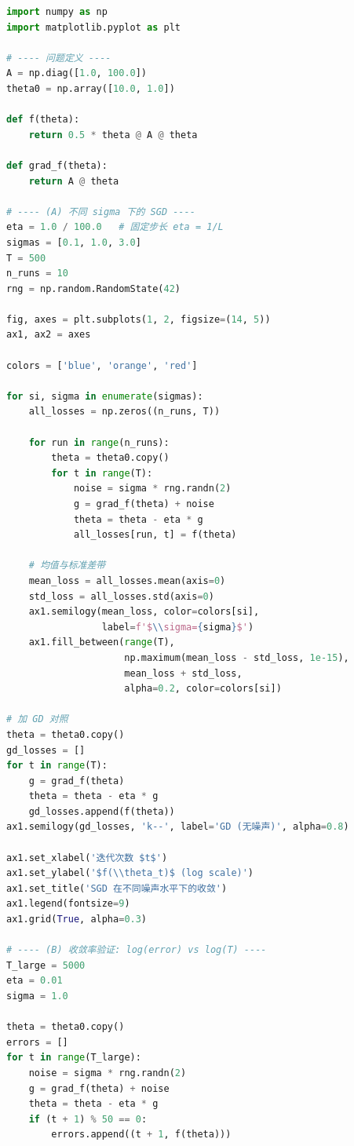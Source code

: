 \documentclass[12pt,a4paper]{ctexart}
\theoremstyle{definition}
\theoremstyle{plain}
\begin{document}
\begin{lstlisting}[language=Python, caption={SGD 噪声方差与收敛率验证}]
import numpy as np
import matplotlib.pyplot as plt

# ---- 问题定义 ----
A = np.diag([1.0, 100.0])
theta0 = np.array([10.0, 1.0])

def f(theta):
    return 0.5 * theta @ A @ theta

def grad_f(theta):
    return A @ theta

# ---- (A) 不同 sigma 下的 SGD ----
eta = 1.0 / 100.0   # 固定步长 eta = 1/L
sigmas = [0.1, 1.0, 3.0]
T = 500
n_runs = 10
rng = np.random.RandomState(42)

fig, axes = plt.subplots(1, 2, figsize=(14, 5))
ax1, ax2 = axes

colors = ['blue', 'orange', 'red']

for si, sigma in enumerate(sigmas):
    all_losses = np.zeros((n_runs, T))

    for run in range(n_runs):
        theta = theta0.copy()
        for t in range(T):
            noise = sigma * rng.randn(2)
            g = grad_f(theta) + noise
            theta = theta - eta * g
            all_losses[run, t] = f(theta)

    # 均值与标准差带
    mean_loss = all_losses.mean(axis=0)
    std_loss = all_losses.std(axis=0)
    ax1.semilogy(mean_loss, color=colors[si],
                 label=f'$\\sigma={sigma}$')
    ax1.fill_between(range(T),
                     np.maximum(mean_loss - std_loss, 1e-15),
                     mean_loss + std_loss,
                     alpha=0.2, color=colors[si])

# 加 GD 对照
theta = theta0.copy()
gd_losses = []
for t in range(T):
    g = grad_f(theta)
    theta = theta - eta * g
    gd_losses.append(f(theta))
ax1.semilogy(gd_losses, 'k--', label='GD (无噪声)', alpha=0.8)

ax1.set_xlabel('迭代次数 $t$')
ax1.set_ylabel('$f(\\theta_t)$ (log scale)')
ax1.set_title('SGD 在不同噪声水平下的收敛')
ax1.legend(fontsize=9)
ax1.grid(True, alpha=0.3)

# ---- (B) 收敛率验证: log(error) vs log(T) ----
T_large = 5000
eta = 0.01
sigma = 1.0

theta = theta0.copy()
errors = []
for t in range(T_large):
    noise = sigma * rng.randn(2)
    g = grad_f(theta) + noise
    theta = theta - eta * g
    if (t + 1) % 50 == 0:
        errors.append((t + 1, f(theta)))


\end{lstlisting}
\end{document}
